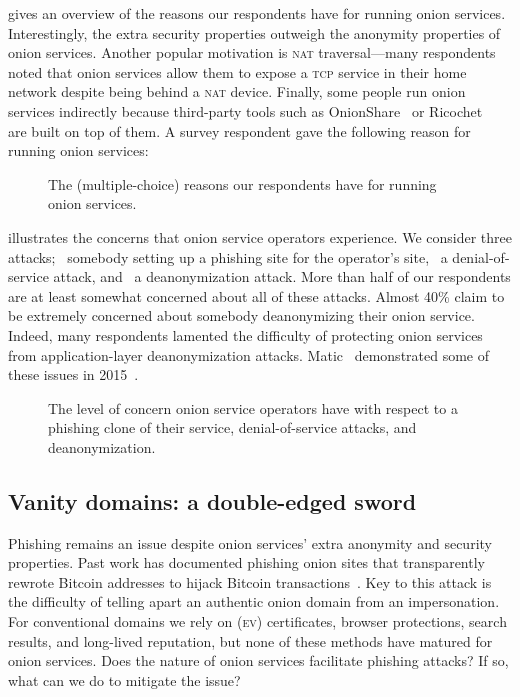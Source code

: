  gives an overview of the reasons our
respondents have for running onion services.  Interestingly, the extra security
properties outweigh the anonymity properties of onion services.  Another popular
motivation is \textsc{nat} traversal---many respondents noted that onion
services allow them to expose a \textsc{tcp} service in their home network
despite being behind a \textsc{nat} device.  Finally, some people run onion
services indirectly because third-party tools such as
OnionShare~\cite{onionshare} or Ricochet~\cite{ricochet} are built on top of
them.  A survey respondent gave the following reason for running onion services:

\begin{figure}[t]
    \centering
    
    \caption{The (multiple-choice) reasons our respondents have for running
    onion services.}
    \label{fig:onion-operation-reasons}
\end{figure}

 illustrates the concerns that onion service
operators experience.  We consider three attacks; \first~somebody setting up a
phishing site for the operator's site, \second~a denial-of-service attack, and
\third~a deanonymization attack.  More than half of our respondents are at least
somewhat concerned about all of these attacks.  Almost 40\% claim to be
extremely concerned about somebody deanonymizing their onion service.  Indeed,
many respondents lamented the difficulty of protecting onion services from
application-layer deanonymization attacks.  Matic \ea\ demonstrated some of
these issues in 2015~\cite{Matic2015a}.

\begin{figure}[t]
    \centering
    
    \caption{The level of concern onion service operators have with respect to a
    phishing clone of their service, denial-of-service attacks, and
    deanonymization.}
    \label{fig:onion-operation-concerns}
\end{figure}

\subsection{Vanity domains: a double-edged sword}

Phishing remains an issue despite onion services' extra anonymity and security
properties.  Past work has documented phishing onion sites that transparently
rewrote Bitcoin addresses to hijack Bitcoin
transactions~\cite{Winter2016a,Nurmi2015a,Monteiro2016a}.  Key to this attack is
the difficulty of telling apart an authentic onion domain from an impersonation.
For conventional domains we rely on (\textsc{ev}) certificates, browser
protections, search results, and long-lived reputation, but none of these
methods have matured for onion services.  Does the nature of onion services
facilitate phishing attacks?  If so, what can we do to mitigate the issue?


